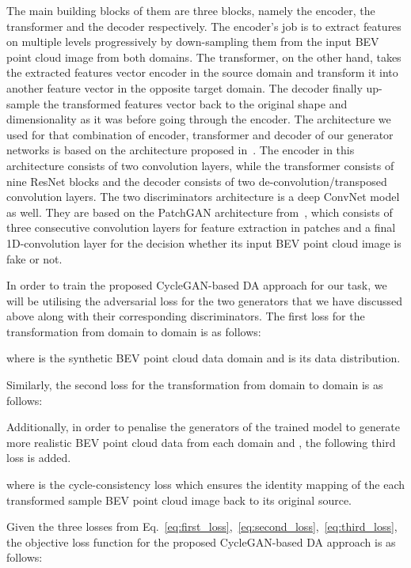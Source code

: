 \documentclass[letterpaper, 10 pt, conference]{IEEEtran}
\begin{document}
\smallbreak
The main building blocks of them are three blocks, namely the encoder, the transformer and the decoder respectively. The encoder's job is to extract features on multiple levels progressively by down-sampling them from the input BEV point cloud image from both domains. The transformer, on the other hand, takes the extracted features vector encoder in the source domain and transform it into another feature vector in the opposite target domain. The decoder finally up-sample the transformed features vector back to the original shape and dimensionality as it was before going through the encoder. The architecture we used for that combination of encoder, transformer and decoder of our generator networks is based on the architecture proposed in~\cite{johnson2016perceptual}. The encoder in this architecture consists of two convolution layers, while the transformer consists of nine ResNet blocks and the decoder consists of two de-convolution/transposed convolution layers. The two discriminators architecture is a deep ConvNet model as well. They are based on the PatchGAN architecture from~\cite{isola2017image}, which consists of three consecutive convolution layers for feature extraction in patches and a final 1D-convolution layer for the decision whether its input BEV point cloud image is fake or not. 

\smallbreak
In order to train the proposed CycleGAN-based DA approach for our task, we will be utilising the adversarial loss for the two generators that we have discussed above along with their corresponding discriminators.  The first loss for the transformation from domain  to domain  is as follows:



where  is the synthetic BEV point cloud data domain and   is its data distribution.

\smallbreak
Similarly, the second loss for the transformation from domain  to domain  is as follows:


Additionally, in order to penalise the generators of the trained model to generate more realistic BEV point cloud data from each domain  and , the following third loss is added. 



where  is the cycle-consistency loss which ensures the identity mapping of the each transformed sample BEV point cloud image back to its original source. 

\smallbreak
Given the three losses from Eq.~\ref{eq:first_loss},~\ref{eq:second_loss},~\ref{eq:third_loss}, the objective loss function for the proposed CycleGAN-based DA approach is as follows:
\end{document}
